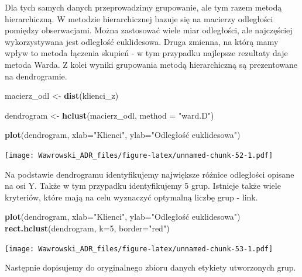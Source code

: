 \documentclass[
]{book}
\newenvironment{Shaded}{\begin{snugshade}}{\end{snugshade}}
\newcommand{\DataTypeTok}[1]{\textcolor[rgb]{0.13,0.29,0.53}{#1}}
\newcommand{\DecValTok}[1]{\textcolor[rgb]{0.00,0.00,0.81}{#1}}
\newcommand{\KeywordTok}[1]{\textcolor[rgb]{0.13,0.29,0.53}{\textbf{#1}}}
\newcommand{\NormalTok}[1]{#1}
\newcommand{\OperatorTok}[1]{\textcolor[rgb]{0.81,0.36,0.00}{\textbf{#1}}}
\newcommand{\StringTok}[1]{\textcolor[rgb]{0.31,0.60,0.02}{#1}}
\begin{document}
Dla tych samych danych przeprowadzimy grupowanie, ale tym razem metodą hierarchiczną. W metodzie hierarchicznej bazuje się na macierzy odległości pomiędzy obserwacjami. Można zastosować wiele miar odległości, ale najczęściej wykorzystywana jest odległość euklidesowa. Druga zmienna, na którą mamy wpływ to metoda łączenia skupień - w tym przypadku najlepsze rezultaty daje metoda Warda. Z kolei wyniki grupowania metodą hierarchiczną są prezentowane na dendrogramie.

\begin{Shaded}
\begin{Highlighting}[]
\NormalTok{macierz_odl <-}\StringTok{ }\KeywordTok{dist}\NormalTok{(klienci_z)}

\NormalTok{dendrogram <-}\StringTok{ }\KeywordTok{hclust}\NormalTok{(macierz_odl, }\DataTypeTok{method =} \StringTok{"ward.D"}\NormalTok{)}

\KeywordTok{plot}\NormalTok{(dendrogram, }\DataTypeTok{xlab=}\StringTok{"Klienci"}\NormalTok{, }\DataTypeTok{ylab=}\StringTok{"Odległość euklidesowa"}\NormalTok{)}
\end{Highlighting}
\end{Shaded}

\texttt{[image: Wawrowski\_ADR\_files/figure-latex/unnamed-chunk-52-1.pdf]}

Na podstawie dendrogramu identyfikujemy największe różnice odległości opisane na osi Y. Także w tym przypadku identyfikujemy 5 grup. Istnieje także wiele kryteriów, które mają na celu wyznaczyć optymalną liczbę grup - link.

\begin{Shaded}
\begin{Highlighting}[]
\KeywordTok{plot}\NormalTok{(dendrogram, }\DataTypeTok{xlab=}\StringTok{"Klienci"}\NormalTok{, }\DataTypeTok{ylab=}\StringTok{"Odległość euklidesowa"}\NormalTok{)}
\KeywordTok{rect.hclust}\NormalTok{(dendrogram, }\DataTypeTok{k=}\DecValTok{5}\NormalTok{, }\DataTypeTok{border=}\StringTok{"red"}\NormalTok{)}
\end{Highlighting}
\end{Shaded}

\texttt{[image: Wawrowski\_ADR\_files/figure-latex/unnamed-chunk-53-1.pdf]}

Następnie dopisujemy do oryginalnego zbioru danych etykiety utworzonych grup.

\begin{Shaded}
\end{Shaded}
\end{document}
